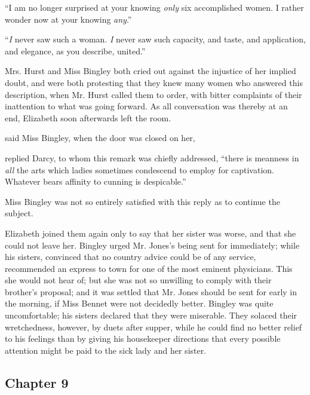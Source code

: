 “I am no longer surprised at your knowing {\em only} six accomplished women. I rather wonder now at your knowing {\em any}.”


“{\em I} never saw such a woman. {\em I} never saw such capacity, and taste, and application, and elegance, as you describe, united.”

Mrs. Hurst and Miss Bingley both cried out against the injustice of her implied doubt, and were both protesting that they knew many women who answered this description, when Mr. Hurst called them to order, with bitter complaints of their inattention to what was going forward. As all conversation was thereby at an end, Elizabeth soon afterwards left the room.

 said Miss Bingley, when the door was closed on her, 

 replied Darcy, to whom this remark was chiefly addressed, “there is meanness in {\em all} the arts which ladies sometimes condescend to employ for captivation. Whatever bears affinity to cunning is despicable.”

Miss Bingley was not so entirely satisfied with this reply as to continue the subject.

Elizabeth joined them again only to say that her sister was worse, and that she could not leave her. Bingley urged Mr. Jones's being sent for immediately; while his sisters, convinced that no country advice could be of any service, recommended an express to town for one of the most eminent physicians. This she would not hear of; but she was not so unwilling to comply with their brother's proposal; and it was settled that Mr. Jones should be sent for early in the morning, if Miss Bennet were not decidedly better. Bingley was quite uncomfortable; his sisters declared that they were miserable. They solaced their wretchedness, however, by duets after supper, while he could find no better relief to his feelings than by giving his housekeeper directions that every possible attention might be paid to the sick lady and her sister.

\subsection[chapter-9]{\useURL[url9][][][]\from[url9] Chapter 9}

